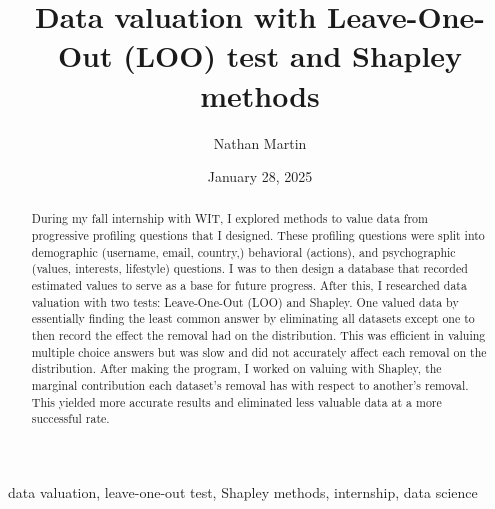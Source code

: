﻿\documentclass[12pt,conference,onecolumn]{IEEEtran}
\title{Data valuation with Leave-One-Out (LOO) test and Shapley methods}
\author{Nathan Martin}
\date{January 28, 2025}
\begin{document}
\maketitle 

\begin{abstract}
During my fall internship with WIT, I explored methods to value  data from progressive profiling questions that I designed. These profiling questions were split into demographic (username, email, country,) behavioral (actions), and psychographic (values, interests, lifestyle) questions. I was to then design a database that recorded estimated values to serve as a base for future progress. After this, I researched data valuation with two tests: Leave-One-Out (LOO) and Shapley. One valued data by essentially finding the least common answer by eliminating all datasets except one to then record the effect the removal had on the distribution. This was efficient in valuing multiple choice answers but was slow and did not accurately affect each removal on the distribution. After making the program, I worked on valuing with Shapley, the marginal contribution each dataset’s removal has with respect to another’s removal. This yielded more accurate results and eliminated less valuable data at a more successful rate.
\end{abstract}

\begin{IEEEkeywords}
data valuation, leave-one-out test, Shapley methods, internship, data science
\end{IEEEkeywords}
\end{document}
